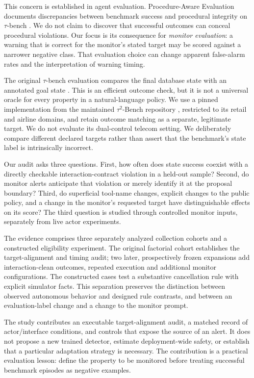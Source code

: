 \documentclass[10pt]{article}
\begin{document}
This concern is established in agent evaluation. Procedure-Aware Evaluation documents discrepancies between benchmark success and procedural integrity on $\tau$-bench \citep{cao2026procedure}. We do not claim to discover that successful outcomes can conceal procedural violations. Our focus is its consequence for \emph{monitor evaluation}: a warning that is correct for the monitor's stated target may be scored against a narrower negative class. That evaluation choice can change apparent false-alarm rates and the interpretation of warning timing.

The original $\tau$-bench evaluation compares the final database state with an annotated goal state \citep{yao2024tau}. This is an efficient outcome check, but it is not a universal oracle for every property in a natural-language policy. We use a pinned implementation from the maintained $\tau^2$-Bench repository \citep{barres2025tau2}, restricted to its retail and airline domains, and retain outcome matching as a separate, legitimate target. We do not evaluate its dual-control telecom setting. We deliberately compare different declared targets rather than assert that the benchmark's state label is intrinsically incorrect.

Our audit asks three questions. First, how often does state success coexist with a directly checkable interaction-contract violation in a held-out sample? Second, do monitor alerts anticipate that violation or merely identify it at the proposal boundary? Third, do superficial tool-name changes, explicit changes to the public policy, and a change in the monitor's requested target have distinguishable effects on its score? The third question is studied through controlled monitor inputs, separately from live actor experiments.

The evidence comprises three separately analyzed collection cohorts and a constructed eligibility experiment. The original factorial cohort establishes the target-alignment and timing audit; two later, prospectively frozen expansions add interaction-clean outcomes, repeated execution and additional monitor configurations. The constructed cases test a substantive cancellation rule with explicit simulator facts. This separation preserves the distinction between observed autonomous behavior and designed rule contrasts, and between an evaluation-label change and a change to the monitor prompt.

The study contributes an executable target-alignment audit, a matched record of actor/interface conditions, and controls that expose the source of an alert. It does not propose a new trained detector, estimate deployment-wide safety, or establish that a particular adaptation strategy is necessary. The contribution is a practical evaluation lesson: define the property to be monitored before treating successful benchmark episodes as negative examples.
\end{document}
